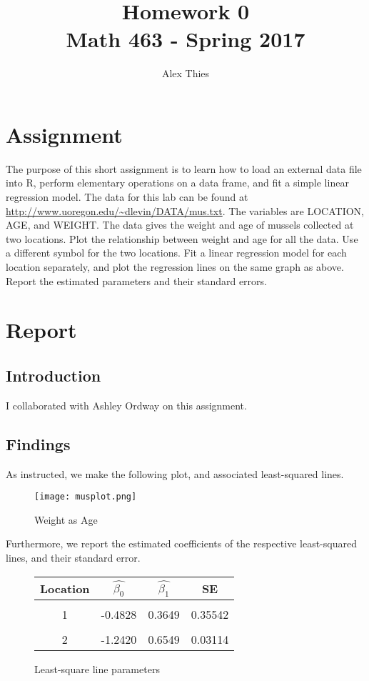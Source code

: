 \documentclass{amsart}
\author{Alex Thies}
\title{Homework 0 \\ Math 463 - Spring 2017}
\begin{document}
	\maketitle
	
	\section{Assignment} %
	\label{sec:assignment}
	The purpose of this short assignment is to learn how to load an external data file into R, perform elementary operations on a data frame, and fit a simple linear regression model.
	The data for this lab can be found at \url{http://www.uoregon.edu/~dlevin/DATA/mus.txt}.
	The variables are LOCATION, AGE, and WEIGHT. The data gives the weight and age of mussels collected at two locations.
	Plot the relationship between weight and age for all the data. Use a different symbol for the two locations.
	Fit a linear regression model for each location separately, and plot the regression lines on the same graph as above.
	Report the estimated parameters and their standard errors.	
	
	\section{Report} %
	\label{sec:report}
		\subsection{Introduction} %
		\label{sub:introduction}
			I collaborated with Ashley Ordway on this assignment.
		\subsection{Findings} %
		\label{sub:findings}
			As instructed, we make the following plot, and associated least-squared lines.
			\begin{figure}[h]
				\texttt{[image: musplot.png]}
				\caption{Weight as Age}
				\label{fig1}
			\end{figure}

			Furthermore, we report the estimated coefficients of the respective least-squared lines, and their standard error.

			\begin{figure}
				\begin{tabular}{c|ccc}
					\hline
					Location & $\hat{\beta_{0}}$ & $\hat{\beta_{1}}$ & SE \\
					\hline \\
					1 & -0.4828 & 0.3649 & 0.35542 \\
					\hline \\
					2 & -1.2420 & 0.6549 & 0.03114 \\
					\hline
				\end{tabular}
				\caption{Least-square line parameters}
				\label{fig2}
			\end{figure}

\end{document}
